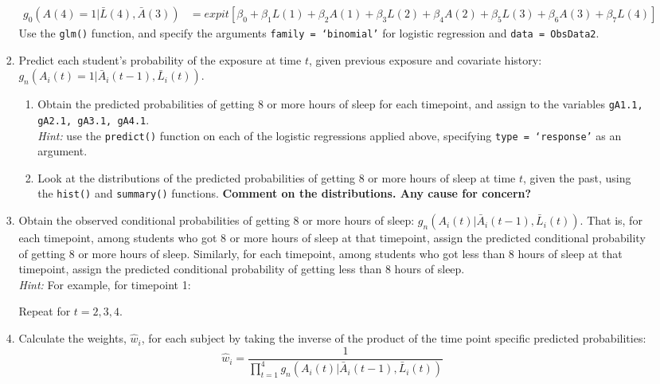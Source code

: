 \documentclass{exam}
\begin{document}
\begin{enumerate}
\begin{enumerate}
\begin{enumerate}
\begin{align*}
g_0(A(4)=1|\bar{L}(4), \bar{A}(3)) & = expit[\beta_0 + \beta_1L(1) + \beta_2A(1) + \beta_3L(2) + \beta_4A(2) + \beta_5L(3) + \beta_6A(3) + \beta_7L(4)]
\end{align*}
Use the \texttt{glm()} function, and specify the arguments \texttt{family = `binomial'} for logistic regression and \texttt{data = ObsData2}.
\item Predict each student's probability of the exposure at time $t$, given previous exposure and covariate history: $g_n(A_i(t)=1|\bar{A}_i(t-1), \bar{L}_i(t))$.
\begin{enumerate}
\item Obtain the predicted probabilities of getting 8 or more hours of sleep for each timepoint, and assign to the variables \texttt{gA1.1, gA2.1, gA3.1, gA4.1}. \\
\textit{Hint:} use the \texttt{predict()} function on each of the logistic regressions applied above, specifying \texttt{type = `response'} as an argument.
\item Look at the distributions of the predicted probabilities of getting 8 or more hours of sleep at time $t$, given the past, using the \texttt{hist()} and \texttt{summary()} functions. \textbf{Comment on the distributions. Any cause for concern?}
\end{enumerate}
\item Obtain the observed conditional probabilities of getting 8 or more hours of sleep: $g_n(A_i(t)|\bar{A}_i(t-1), \bar{L}_i(t))$. That is, for each timepoint, among students who got 8 or more hours of sleep at that timepoint, assign the predicted conditional probability of getting 8 or more hours of sleep. Similarly, for each timepoint, among students who got less than 8 hours of sleep at that timepoint, assign the predicted conditional probability of getting less than 8 hours of sleep.\\
\textit{Hint:} For example, for timepoint 1:
\begin{Schunk}
\end{Schunk}
Repeat for $t = 2, 3, 4$.
\item Calculate the weights, $_i$, for each subject by taking the inverse of the product of the time point specific predicted probabilities: 
\[
\hat{w}_i = \frac{1}{\prod_{t=1}^4g_n(A_i(t)|\bar{A}_i(t-1), \bar{L}_i(t))}
\]
\end{enumerate}
\end{enumerate}
\end{enumerate}
\end{document}

